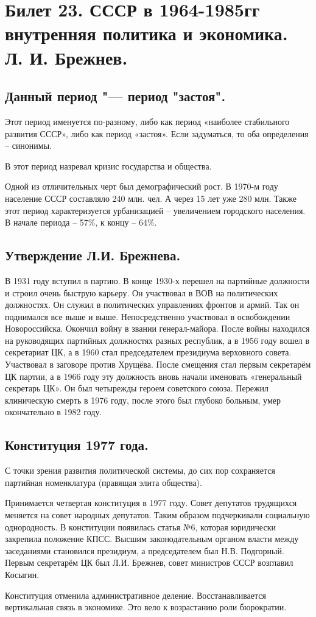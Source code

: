 \section{Билет 23. СССР в 1964-1985гг внутренняя политика и экономика. Л. И. Брежнев.}

\subsection{Данный период "--- период "застоя".}

Этот период именуется по-разному, либо как период «наиболее стабильного развития СССР», либо как период «застоя». Если задуматься, то оба определения – синонимы. 

В этот период назревал кризис государства и общества. 

Одной из отличительных черт был демографический рост. В 1970-м году население СССР составляло 240 млн. чел. А через 15 лет уже 280 млн. Также этот период характеризуется урбанизацией – увеличением городского населения. В начале периода – 57\%, к концу – 64\%.

\subsection{Утверждение Л.И. Брежнева.}

В 1931 году вступил в партию. В конце 1930-х перешел на партийные должности и строил очень быструю карьеру. Он участвовал в ВОВ на политических должностях. Он служил в политических управлениях фронтов и армий. Так он поднимался все выше и выше. Непосредственно участвовал в освобождении Новороссийска. Окончил войну в звании генерал-майора. После войны находился на руководящих партийных должностях разных республик, а в 1956 году вошел в секретариат ЦК, а в 1960 стал председателем президиума верховного совета. Участвовал в заговоре против Хрущёва. После смещения стал первым секретарём ЦК партии, а в 1966 году эту должность вновь начали именовать «генеральный секретарь ЦК». Он был четырежды героем советского союза. Пережил клиническую смерть в 1976 году, после этого был глубоко больным, умер окончательно в 1982 году. 

\subsection{Конституция 1977 года.}

С точки зрения развития политической системы, до сих пор сохраняется партийная номенклатура (правящая элита общества). 

Принимается четвертая конституция в 1977 году. Совет депутатов трудящихся меняется на совет народных депутатов. Таким образом подчеркивали социальную однородность. В конституции появилась статья №6, которая юридически закрепила положение КПСС. Высшим законодательным органом власти между заседаниями становился президиум, а председателем был Н.В. Подгорный. Первым секретарём ЦК был Л.И. Брежнев, совет министров СССР возглавил Косыгин.

Конституция отменила административное деление. Восстанавливается вертикальная связь в экономике. Это вело к возрастанию роли бюрократии. 

